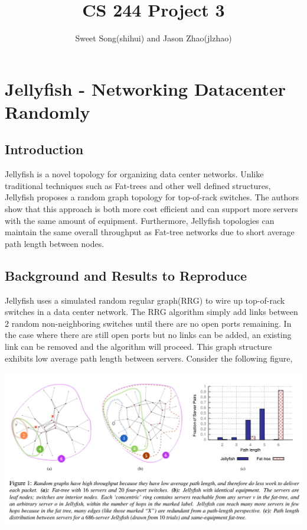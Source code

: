 \documentclass[letter paper, 11pt]{article}
\title{CS 244 Project 3}
\author{Sweet Song(shihui) and Jason Zhao(jlzhao)}
\date{}
\begin{document}
\maketitle{}
\section*{Jellyfish - Networking Datacenter Randomly}
\subsection*{Introduction}


Jellyfish is a novel topology for organizing data center networks. Unlike traditional techniques such as Fat-trees and other well defined structures, Jellyfish proposes a random graph topology for top-of-rack switches. The authors show that this approach is both more cost efficient and can support more servers with the same amount of equipment. Furthermore, Jellyfish topologies can maintain the same overall throughput as Fat-tree networks due to short average path length between nodes.

\subsection*{Background and Results to Reproduce}


Jellyfish uses a simulated random regular graph(RRG) to wire up top-of-rack switches in a data center network. The RRG algorithm simply add links between 2 random non-neighboring switches until there are no open ports remaining. In the case where there are still open ports but no links can be added, an existing link can be removed and the algorithm will proceed. This graph structure exhibits low average path length between servers. Consider the following figure,

\begin{center}
\includegraphics[scale=0.4]{jellyfish}
\end{center}
\end{document}
